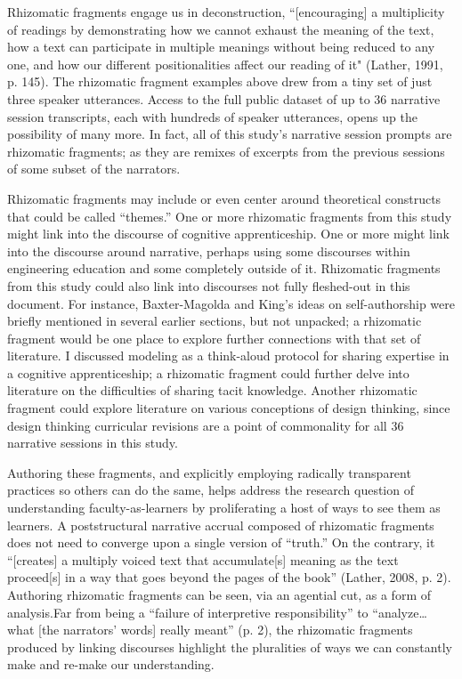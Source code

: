 Rhizomatic fragments engage us in deconstruction, “[encouraging] a multiplicity of readings by demonstrating how we cannot exhaust the meaning of the text, how a text can participate in multiple meanings without being reduced to any one, and how our different positionalities affect our reading of it" (Lather, 1991, p. 145). The rhizomatic fragment examples above drew from a tiny set of just three speaker utterances. Access to the full public dataset of up to 36 narrative session transcripts, each with hundreds of speaker utterances, opens up the possibility of many more. In fact, all of this study’s narrative session prompts are rhizomatic fragments; as they are remixes of excerpts from the previous sessions of some subset of the narrators.

Rhizomatic fragments may include or even center around theoretical constructs that could be called “themes.” One or more rhizomatic fragments from this study might link into the discourse of cognitive apprenticeship. One or more might link into the discourse around narrative, perhaps using some discourses within engineering education and some completely outside of it. Rhizomatic fragments from this study could also link into discourses not fully fleshed-out in this document. For instance, Baxter-Magolda and King’s ideas on self-authorship were briefly mentioned in several earlier sections, but not unpacked; a rhizomatic fragment would be one place to explore further connections with that set of literature. I discussed modeling as a think-aloud protocol for sharing expertise in a cognitive apprenticeship; a rhizomatic fragment could further delve into literature on the difficulties of sharing tacit knowledge. Another rhizomatic fragment could explore literature on various conceptions of design thinking, since design thinking curricular revisions are a point of commonality for all 36 narrative sessions in this study.

Authoring these fragments, and explicitly employing radically transparent practices so others can do the same, helps address the research question of understanding faculty-as-learners by proliferating a host of ways to see them as learners. A poststructural narrative accrual composed of rhizomatic fragments does not need to converge upon a single version of “truth.” On the contrary, it “[creates] a multiply voiced text that accumulate[s] meaning as the text proceed[s] in a way that goes beyond the pages of the book” (Lather, 2008, p. 2). Authoring rhizomatic fragments can be seen, via an agential cut, as a form of analysis.Far from being a “failure of interpretive responsibility” to “analyze… what [the narrators’ words] really meant” (p. 2), the rhizomatic fragments produced by linking discourses highlight the pluralities of ways we can constantly make and re-make our understanding.
